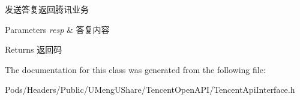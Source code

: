 发送答复返回腾讯业务 
\begin{DoxyParams}{Parameters}
{\em resp} & 答复内容 \\
\hline
\end{DoxyParams}
\begin{DoxyReturn}{Returns}
返回码 
\end{DoxyReturn}


The documentation for this class was generated from the following file\+:\begin{DoxyCompactItemize}
\item 
Pods/\+Headers/\+Public/\+U\+Meng\+U\+Share/\+Tencent\+Open\+A\+P\+I/Tencent\+Api\+Interface.\+h\end{DoxyCompactItemize}
